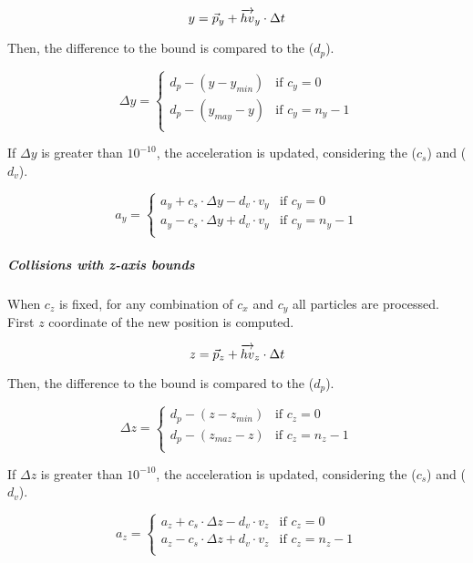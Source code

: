 \[
y = \vec{p}_y + \overrightarrow{hv}_y \cdot \Delta t \\
\]

Then, the difference to the bound is compared to the 
($d_p$).

\[
\Delta y = 
\begin{cases}
d_p - (y - y_{min}) & \text{if } c_y = 0\\
d_p - (y_{may} - y) & \text{if } c_y = n_y -1\\
\end{cases}
\]

If $\Delta y$ is greater than $10^{-10}$, the acceleration is updated,
considering the  ($c_s$) and 
($d_v$).

\[
a_y = 
\begin{cases}
  a_y + c_s \cdot \Delta y - d_v \cdot v_y & \text{if  } c_y = 0\\
  a_y - c_s \cdot \Delta y + d_v \cdot v_y & \text{if  } c_y = n_y-1\\
\end{cases}
\]

\subparagraph{Collisions with z-axis bounds}

When $c_z$ is fixed, for any combination of $c_x$ and $c_y$ all particles are
processed. First $z$ coordinate of the new position is computed.

\[
z = \vec{p}_z + \overrightarrow{hv}_z \cdot \Delta t \\
\]

Then, the difference to the bound is compared to the 
($d_p$).

\[
\Delta z = 
\begin{cases}
d_p - (z - z_{min}) & \text{if } c_z = 0\\
d_p - (z_{maz} - z) & \text{if } c_z = n_z -1\\
\end{cases}
\]

If $\Delta z$ is greater than $10^{-10}$, the acceleration is updated,
considering the  ($c_s$) and 
($d_v$).

\[
a_z = 
\begin{cases}
  a_z + c_s \cdot \Delta z - d_v \cdot v_z & \text{if  } c_z = 0\\
  a_z - c_s \cdot \Delta z + d_v \cdot v_z & \text{if  } c_z = n_z-1\\
\end{cases}
\]


